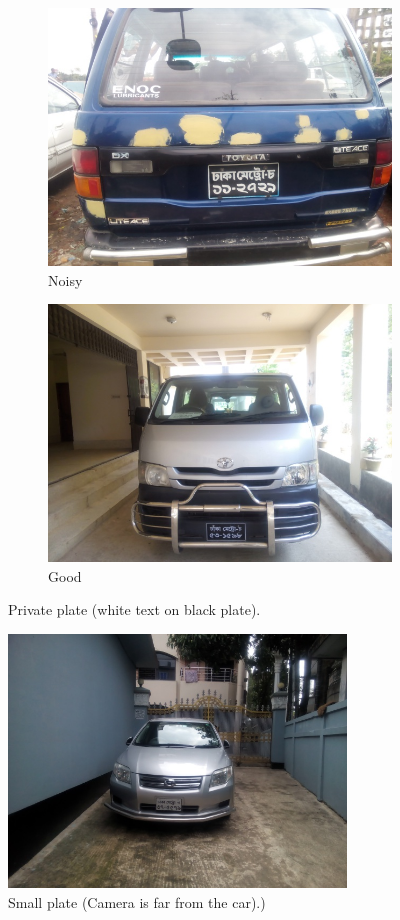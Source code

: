 \documentclass{standalone}
\begin{document}
\begin{figure}
\begin{subfigure}{0.5\textwidth}
    \centering
    \includegraphics[width=0.9\linewidth]{./img/experiment/stage.1/private}
    \caption{Noisy}
\end{subfigure}
\begin{subfigure}{0.5\textwidth}
    \centering
    \includegraphics[width=0.9\linewidth]{./img/experiment/stage.1/private2}
    \caption{Good}
\end{subfigure}
\caption{Private plate (white text on black plate).}
\end{figure}


\begin{figure}
    \centering
    \includegraphics[width=0.8\textwidth]{./img/experiment/stage.1/small}
    \caption{Small plate (Camera is far from the car).)}
\end{figure}
\end{document}
